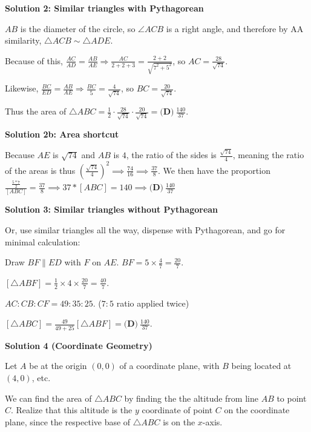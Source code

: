 \begin{enumerate}
 



\textbf{Solution 2: Similar triangles with Pythagorean}

$AB$ is the diameter of the circle, so $\angle ACB$ is a right angle, and therefore by AA similarity, $\triangle ACB \sim \triangle ADE$.

 Because of this, $\frac{AC}{AD} = \frac{AB}{AE} \Longrightarrow \frac{AC}{2+2+3} = \frac{2+2}{\sqrt{7^2 + 5^2}}$, so $AC = \frac{28}{\sqrt{74}}$.

 Likewise, $\frac{BC}{ED} = \frac{AB}{AE} \Longrightarrow \frac{BC}{5} = \frac{4}{\sqrt{74}}$, so $BC = \frac{20}{\sqrt{74}}$.

 Thus the area of $\triangle ABC = \frac{1}{2} \cdot \frac{28}{\sqrt{74}} \cdot \frac{20}{\sqrt{74}} = \boxed{\textbf{(D)}\ \frac{140}{37}}$.

 



\textbf{Solution 2b: Area shortcut}

Because $AE$ is $\sqrt{74}$ and $AB$ is $4$, the ratio of the sides is $\frac{\sqrt{74}}{4}$, meaning the ratio of the areas is thus ${(\frac{\sqrt{74}}{4})}^2 \implies \frac{74}{16} \implies \frac{37}{8}$. We then have the proportion $\frac{\frac{5*7}{2}}{[ABC]}=\frac{37}{8} \implies 37*[ABC]=140 \implies \boxed{\textbf{(D)}\ \frac{140}{37}}$




\textbf{Solution 3: Similar triangles without Pythagorean}

Or, use similar triangles all the way, dispense with Pythagorean, and go for minimal calculation:

 Draw $BF \parallel ED$ with $F$ on $AE$. $BF=5\times\frac{4}{7}=\frac{20}{7}$.

 $[\triangle ABF]=\frac{1}{2} \times 4 \times \frac{20}{7}=\frac{40}{7}$.

 $AC:CB:CF=49:35:25$.  ($7:5$ ratio applied twice)

 $[\triangle ABC]=\frac{49}{49+25}[\triangle ABF]=\boxed{\textbf{(D)}\ \frac{140}{37}}$.

 



\textbf{Solution 4 (Coordinate Geometry)}

Let $A$ be at the origin $(0, 0)$ of a coordinate plane, with $B$ being located at $(4, 0)$, etc.

 We can find the area of $\triangle ABC$ by finding the the altitude from line $AB$ to point $C$. Realize that this altitude is the $y$ coordinate of point $C$ on the coordinate plane, since the respective base of $\triangle ABC$ is on the $x$-axis.


\end{enumerate}
